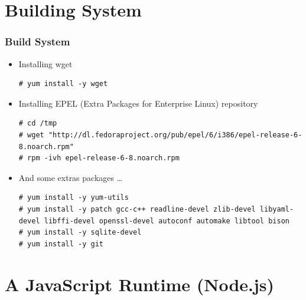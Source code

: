 \documentclass{beamer}
\begin{document}
\section{Building System}
\begin{frame}[fragile]
\frametitle{Build System}
\lstset{language=shell, escapechar=!}
\begin{itemize}
\item Installing wget
\begin{lstlisting}[escapechar=!]
# yum install -y wget
\end{lstlisting}

\item Installing EPEL (Extra Packages for Enterprise Linux) repository 
\begin{lstlisting}[escapechar=!]
# cd /tmp
# wget "http://dl.fedoraproject.org/pub/epel/6/i386/epel-release-6-8.noarch.rpm"
# rpm -ivh epel-release-6-8.noarch.rpm
\end{lstlisting}

\item And some extras packages \dots

\begin{lstlisting}[escapechar=!]
# yum install -y yum-utils
# yum install -y patch gcc-c++ readline-devel zlib-devel libyaml-devel libffi-devel openssl-devel autoconf automake libtool bison
# yum install -y sqlite-devel
# yum install -y git
\end{lstlisting}
\end{itemize}
\end{frame}
\section{A JavaScript Runtime (Node.js)}
\end{document}
